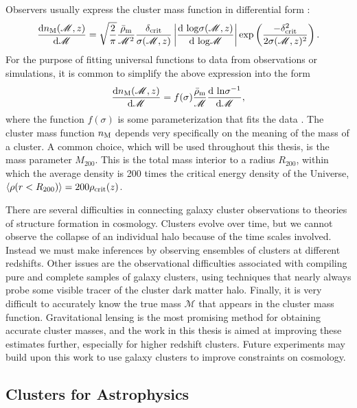 Observers usually express the cluster mass function in differential form \citep{Borgani08}:
\begin{equation}
\label{eqn:diffmassfunc}
\frac{{\rm d} n_{\rm M} ({\mathscr M},z)}{{\rm d}{\mathscr M}} = \sqrt{\frac{2}{\pi}} \frac{\bar{\rho}_{\rm m}}{{\mathscr M}^2} \frac{\delta_{\rm crit}}{\sigma({\mathscr M},z)} \left| \frac{{\rm d \ log}\sigma({\mathscr M},z)}{{\rm d \ log}{\mathscr M}} \right| {\rm exp}\left( \frac{-\delta_{\rm crit}^2}{2\sigma({\mathscr M},z)^2} \right).
\end{equation}
For the purpose of fitting universal functions to data from observations or simulations, it is common to simplify the above expression into the form
\begin{equation}
\frac{{\rm d} n_{\rm M} ({\mathscr M},z)}{{\rm d}{\mathscr M}} = f(\sigma) \frac{\bar{\rho}_{\rm m}}{\mathscr M} \frac{{\rm d \ ln}\sigma^{-1}}{{\rm d}{\mathscr M}},
\end{equation}
where the function $f(\sigma)$ is some parameterization that fits the data \citep[see e.g.][]{Tinker08}. The cluster mass function $n_{\rm M}$ depends very specifically on the meaning of the mass of a cluster. A common choice, which will be used throughout this thesis, is the mass parameter $M_{200}$. This is the total mass interior to a radius $R_{200}$, within which the average density is 200 times the critical energy density of the Universe, $\langle \rho (r<R_{200}) \rangle = 200 \rho_{\rm crit}(z)$.

There are several difficulties in connecting galaxy cluster observations to theories of structure formation in cosmology. Clusters evolve over time, but we cannot observe the collapse of an individual halo because of the time scales involved. Instead we must make inferences by observing ensembles of clusters at different redshifts. Other issues are the observational difficulties associated with compiling pure and complete samples of galaxy clusters, using techniques that nearly always probe some visible tracer of the cluster dark matter halo. Finally, it is very difficult to accurately know the true mass ${\mathscr M}$ that appears in the cluster mass function. Gravitational lensing is the most promising method for obtaining accurate cluster masses, and the work in this thesis is aimed at improving these estimates further, especially for higher redshift clusters. Future experiments may build upon this work to use galaxy clusters to improve constraints on cosmology.


\subsection{Clusters for Astrophysics}
\label{sec:ClusterAstro}

